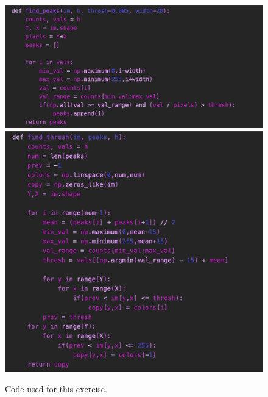 \begin{figure}[H]
	\centering
	\includegraphics[width=0.8\linewidth]{Materials/E4/find_peaks}
	\includegraphics[width=0.8\linewidth]{Materials/E4/find_thresh}
	\caption{Code used for this exercise.}
	\label{E4code}
\end{figure}